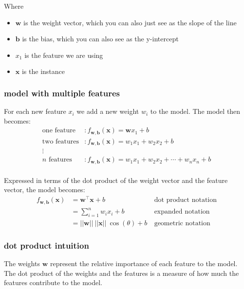 \documentclass[12pt]{article}
\begin{document}
Where 
\begin{itemize}[leftmargin=*, noitemsep]
    \item $\mathbf{w}$ is the weight vector, which you can also just see as the slope of the line
    \item $\mathbf{b}$ is the bias, which you can also see as the y-intercept
    \item $x_1$ is the feature we are using 
    \item $\mathbf{x}$ is the instance
\end{itemize}

\subsubsection*{model with multiple features}

For each new feature $x_i$ we add a new weight $w_i$ to the model. The model then becomes:
\begin{align*}
    \text{one feature} & : f_{\mathbf{w}, \mathbf{b}} (\mathbf{x}) = \mathbf{w}x_1 + b \\
    \text{two features} & : f_{\mathbf{w}, \mathbf{b}} (\mathbf{x}) = w_1x_1 + w_2x_2 + b \\
    \vdots & \\
    \text{$n$ features} & : f_{\mathbf{w}, \mathbf{b}} (\mathbf{x}) = w_1x_1 + w_2x_2 + \cdots + w_n x_n + b \\
\end{align*}

Expressed in terms of the dot product of the weight vector and the feature vector, the model becomes:
\begin{align*}
    f_{\mathbf{w}, \mathbf{b}} (\mathbf{x}) &= \mathbf{w}^\intercal \mathbf{x} + b & \ \text{dot product notation} \\
    & = \sum_{i=1}^{n} w_i x_i + b & \ \text{expanded notation} \\ 
    & = ||\mathbf{w}||\ ||\mathbf{x}|| \ \cos(\theta) + b & \ \text{geometric notation}
\end{align*}

\subsubsection*{dot product intuition} 

The weights $\mathbf{w}$ represent the relative importance of each feature to the model. The dot product of the weights and the features is a measure of how much the features contribute to the model.
\end{document}

